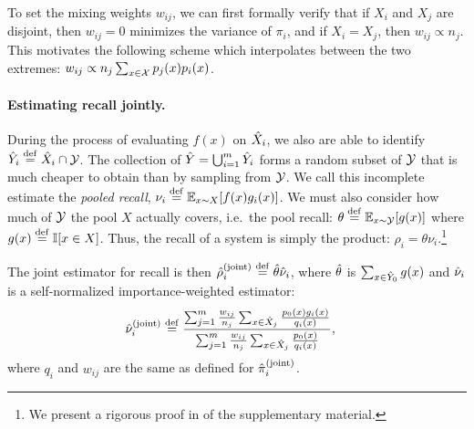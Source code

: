 To set the mixing weights $w_{ij}$, we can first formally verify that
if $X_i$ and $X_j$ are disjoint, then $w_{ij} = 0$ minimizes the variance of $\pi_i$,
and if $X_i = X_j$, then $w_{ij} \propto n_{j}$.
This motivates the following scheme which interpolates between the two extremes:
$w_{ij} \propto n_{j} \sum_{x \in \mathcal{X}} p_j(x) p_i(x)$.

\paragraph{Estimating recall jointly.}
During the process of evaluating $f(x)$ on ${\hat{X}}_i$, we also are able to identify ${\hat{Y}}_i \stackrel{\rm def}{=} {\hat{X}}_i \cap \mathcal{Y}$.
The collection of ${\hat{Y}} = \bigcup_{i=1}^m {\hat{Y}}_i$ forms a random subset of $\mathcal{Y}$ that is much cheaper to obtain than by sampling from $\mathcal{Y}$.
We call this incomplete estimate the \emph{pooled recall},
$\nu_i \stackrel{\rm def}{=} \mathbb{E}_{x \sim X}[f(x) g_i(x)]$.
We must also consider how much of $\mathcal{Y}$ the pool $X$ actually covers, i.e.\ the pool recall: $\theta \stackrel{\rm def}{=} \mathbb{E}_{x \sim \mathcal{Y}}[g(x)]$ where $g(x) \stackrel{\rm def}{=} \mathbb{I}[x \in X]$.
Thus, the recall of a system is simply the product: $\rho_i = \theta \nu_i$.\footnote{%
We present a rigorous proof in  of the supplementary material.}

The joint estimator for recall is then ${\hat{\rho}}_i^{\text{(joint)}} \stackrel{\rm def}{=} {\hat{\theta}}{\hat{\nu}}_i$, where ${\hat{\theta}}$ is $\sum_{x \in {\hat{Y}}_0} g(x)$ and ${\hat{\nu}}_i$ is a self-normalized importance-weighted estimator:
\begin{align*}
  {\hat{\nu}}_i^{\text{(joint)}} &\stackrel{\rm def}{=} \frac{\sum_{j=1}^m \frac{w_{ij}}{n_j} \sum_{x \in {\hat{X}}_j} \frac{p_0(x) g_i(x)}{q_i(x)}}{\sum_{j=1}^m \frac{w_{ij}}{n_j} \sum_{x \in {\hat{X}}_j} \frac{p_0(x)}{q_i(x)}},
\end{align*}
where $q_i$ and $w_{ij}$ are the same as defined for ${\hat{\pi}}_i^{\text{(joint)}}$.

